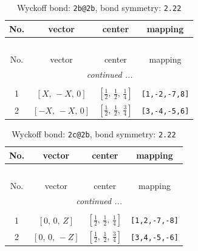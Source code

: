 \documentclass[fleqn,8pt]{jsarticle}
\begin{document}
\renewcommand{\arraystretch}{1.2}
\begin{longtable}{cccc}
\caption{Wyckoff bond: {\tt 2b@2b}, bond symmetry: {\tt 2.22}}
 \\
 \hline \hline
No. & vector & center & mapping \\ \hline \endfirsthead

\multicolumn{3}{l}{\tablename\ \thetable{}} \\
 \hline \hline
No. & vector & center & mapping \\ \hline \endhead

 \hline \hline
\multicolumn{3}{r}{\footnotesize\it continued ...} \\ \endfoot

 \hline \hline
\multicolumn{3}{r}{} \\ \endlastfoot

1 & $\left[ X,\, - X,\, 0 \right]$ & $\left[ \frac{1}{2},\, \frac{1}{2},\, \frac{1}{4} \right]$ & {\tt [1,-2,-7,8]} \\ \hline
2 & $\left[ - X,\, - X,\, 0 \right]$ & $\left[ \frac{1}{2},\, \frac{1}{2},\, \frac{3}{4} \right]$ & {\tt [3,-4,-5,6]} \\
\end{longtable}
\renewcommand{\arraystretch}{1.2}
\begin{longtable}{cccc}
\caption{Wyckoff bond: {\tt 2c@2b}, bond symmetry: {\tt 2.22}}
 \\
 \hline \hline
No. & vector & center & mapping \\ \hline \endfirsthead

\multicolumn{3}{l}{\tablename\ \thetable{}} \\
 \hline \hline
No. & vector & center & mapping \\ \hline \endhead

 \hline \hline
\multicolumn{3}{r}{\footnotesize\it continued ...} \\ \endfoot

 \hline \hline
\multicolumn{3}{r}{} \\ \endlastfoot

1 & $\left[ 0,\, 0,\, Z \right]$ & $\left[ \frac{1}{2},\, \frac{1}{2},\, \frac{1}{4} \right]$ & {\tt [1,2,-7,-8]} \\ \hline
2 & $\left[ 0,\, 0,\, - Z \right]$ & $\left[ \frac{1}{2},\, \frac{1}{2},\, \frac{3}{4} \right]$ & {\tt [3,4,-5,-6]} \\
\end{longtable}
\renewcommand{\arraystretch}{1.2}
\end{document}
